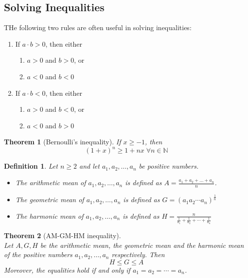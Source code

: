\documentclass[12pt]{article}
\newtheorem{definition}{Definition}[section]
\newtheorem{theorem}{Theorem}[section]
\theoremstyle{definition}
\begin{document}
\subsection{Solving Inequalities}
THe following two rules are often useful in solving inequalities:
\begin{enumerate}[label=Rule \arabic*]
\item If $a\cdot b>0$, then either
\begin{enumerate}[label=(\roman*)]
\item $a>0$ and $b>0$, or
\item $a<0$ and $b<0$
\end{enumerate}
\item If $a\cdot b<0$, then either
\begin{enumerate}[label=(\roman*)]
\item $a>0$ and $b<0$, or
\item $a<0$ and $b>0$
\end{enumerate}
\end{enumerate}
\begin{theorem}[Bernoulli's inequality]\normalfont If $x\geq -1$, then
\[
(1+x)^n\geq 1+nx\;\forall n\in\mathbb{N}
\]
\end{theorem}
\begin{definition}\normalfont Let $n\geq 2$ and let $a_1,a_2,\ldots,a_n$ be positive numbers.
\begin{itemize}
\item The \textit{arithmetic mean} of $a_1,a_2,\ldots,a_n$ is defined as $A = \frac{ a_1+a_2+\ldots+a_n }{n}$.
\item The \textit{geometric mean} of $a_1,a_2,\ldots,a_n$ is defined as $G = (a_1a_2\cdots a_n)^{\frac{1}{n}}$
\item The \textit{harmonic mean} of  $a_1,a_2,\ldots,a_n$ is defined as $H = \frac{n}{\frac{1}{a_1}+\frac{1}{a_2}+\cdots+\frac{1}{a_n}}$
\end{itemize}
\end{definition}
\begin{theorem}[AM-GM-HM inequality]\hfill\\
\normalfont Let $A,G,H$ be the arithmetic mean, the geometric mean and the harmonic mean of the positive numbers $a_1,a_2,\ldots,a_n$ respectively. Then
\[
H\leq G\leq A
\]
Moreover, the equalities hold if and only if $a_1 = a_2 = \cdots = a_n$.
\end{theorem}
\end{document}
